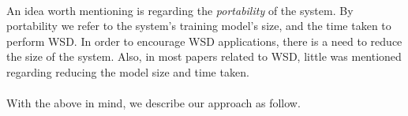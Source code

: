 \paragraph{}
An idea worth mentioning is regarding the \textit{portability} of the system. By portability we refer to the system's training model's size, and the time taken to perform WSD. In order to encourage WSD applications, there is a need to reduce the size of the system. Also, in most papers related to WSD, little was mentioned regarding reducing the model size and time taken.

\paragraph{}
With the above in mind, we describe our approach as follow.
